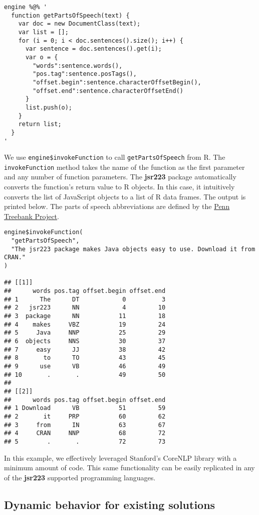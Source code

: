 \documentclass[
article,
11pt, %
a4paper, %
oneside, %
headinclude,footinclude, %
]{scrartcl}
\theoremstyle{definition} %
\theoremstyle{plain} %
\theoremstyle{remark} %
\newcommand{\pkg}[1]{\textbf{#1}}
\newcommand{\code}[1]{\texttt{#1}}
\begin{document}
\begin{verbatim}
engine %@% '
  function getPartsOfSpeech(text) {
    var doc = new DocumentClass(text);
    var list = [];
    for (i = 0; i < doc.sentences().size(); i++) {
      var sentence = doc.sentences().get(i);
      var o = {
        "words":sentence.words(),
        "pos.tag":sentence.posTags(),
        "offset.begin":sentence.characterOffsetBegin(),
        "offset.end":sentence.characterOffsetEnd()
      }
      list.push(o);
    }
    return list;
  }
'
\end{verbatim}
We use \code{engine\$invokeFunction} to call \code{getPartsOfSpeech} from R. The \code{invokeFunction} method takes the name of the function as the first parameter and any number of function parameters. The \pkg{jsr223} package automatically converts the function's return value to R objects. In this case, it intuitively converts the list of JavaScript objects to a list of R data frames. The output is printed below. The parts of speech abbreviations are defined by the \href{https://www.ling.upenn.edu/courses/Fall_2003/ling001/penn_treebank_pos.html}{Penn Treebank Project}. %

\begin{verbatim}
engine$invokeFunction(
  "getPartsOfSpeech",
  "The jsr223 package makes Java objects easy to use. Download it from CRAN."
)

## [[1]]
##      words pos.tag offset.begin offset.end
## 1      The      DT            0          3
## 2   jsr223      NN            4         10
## 3  package      NN           11         18
## 4    makes     VBZ           19         24
## 5     Java     NNP           25         29
## 6  objects     NNS           30         37
## 7     easy      JJ           38         42
## 8       to      TO           43         45
## 9      use      VB           46         49
## 10       .       .           49         50
## 
## [[2]]
##      words pos.tag offset.begin offset.end
## 1 Download      VB           51         59
## 2       it     PRP           60         62
## 3     from      IN           63         67
## 4     CRAN     NNP           68         72
## 5        .       .           72         73
\end{verbatim}

In this example, we effectively leveraged Stanford's CoreNLP library with a minimum amount of code. This same functionality can be easily replicated in any of the \pkg{jsr223} supported programming languages.

\subsection{Dynamic behavior for existing solutions}
\end{document}
